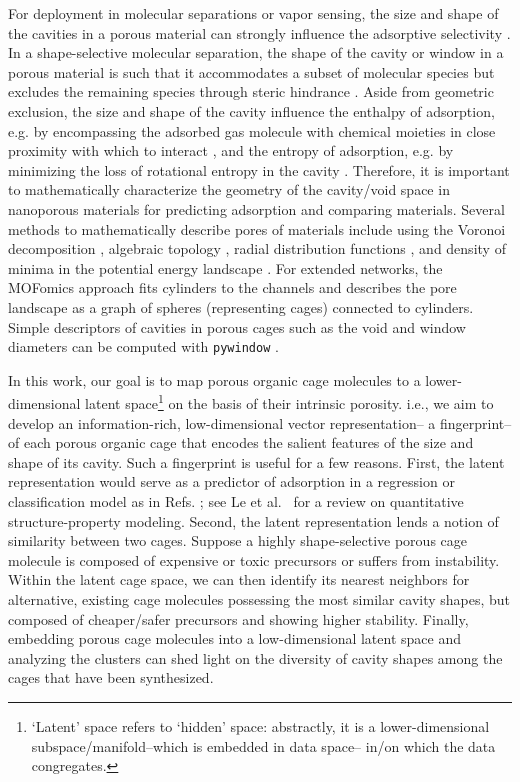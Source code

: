 \documentclass[journal=jacsat,manuscript=article,layout=traditional]{achemso}
\begin{document}
For deployment in molecular separations or vapor sensing, the size and shape of the cavities in a porous material can strongly influence the adsorptive selectivity \cite{mitra2013molecular,zhu1999shape,lee2018high,smit2008towards,sikora2012thermodynamic}. In a shape-selective molecular separation, the shape of the cavity or window in a porous material is such that it accommodates a subset of molecular species but excludes the remaining species through steric hindrance \cite{smit2008towards}. Aside from geometric exclusion, the size and shape of the cavity influence the enthalpy of adsorption, e.g. by encompassing the adsorbed gas molecule with chemical moieties in close proximity with which to interact \cite{simon2015best}, and the entropy of adsorption, e.g. by minimizing the loss of rotational entropy in the cavity \cite{denayer2005rotational}. Therefore, it is important to mathematically characterize the geometry of the cavity/void space in nanoporous materials for predicting adsorption and comparing materials. Several methods to mathematically describe pores of materials include using the Voronoi decomposition \cite{pinheiro2013characterization,martin2011addressing}, algebraic topology \cite{lee2017quantifying}, radial distribution functions \cite{fernandez2013atomic}, and density of minima in the potential energy landscape \cite{oganov2009quantify}. For extended networks, the MOFomics \cite{first2013mofomics} approach fits cylinders to the channels and describes the pore landscape as a graph of spheres (representing cages) connected to cylinders. Simple descriptors of cavities in porous cages such as the void and window diameters can be computed with \texttt{pywindow} \cite{miklitz2018pywindow}.

In this work, our goal is to map porous organic cage molecules to a lower-dimensional latent space\footnote{{\color{red} `Latent' space refers to `hidden' space: abstractly, it is a lower-dimensional subspace/manifold--which is embedded in data space-- in/on which the data congregates.}} on the basis of their intrinsic porosity. i.e., we aim to develop an information-rich, low-dimensional vector representation-- a fingerprint-- of each porous organic cage that encodes the salient features of the size and shape of its cavity. Such a fingerprint is useful for a few reasons. First, the latent representation would serve as a predictor of adsorption in a regression or classification model as in Refs. \cite{bucior2018energy,simon2015best}; see Le et al.~\cite{le2012quantitative} for a review on quantitative structure-property modeling. Second, the latent representation lends a notion of similarity between two cages. Suppose a highly shape-selective porous cage molecule is composed of expensive or toxic precursors or suffers from instability. Within the latent cage space, we can then identify its nearest neighbors for alternative, existing cage molecules possessing the most similar cavity shapes, but composed of cheaper/safer precursors and showing higher stability. Finally, embedding porous cage molecules into a low-dimensional latent space and analyzing the clusters can shed light on the diversity of  cavity shapes among the cages that have been synthesized.
\end{document}

